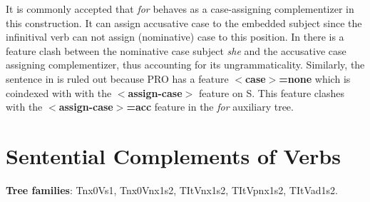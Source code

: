 It is commonly accepted that {\it for\/} behaves as a case-assigning
complementizer in this construction. It can assign accusative case to the
embedded subject since the infinitival verb can not assign
(nominative) case to this position.  
In  there is a feature clash between the nominative case subject {\it
she} and the accusative case assigning complementizer, thus accounting for its
ungrammaticality. Similarly, the sentence in  is ruled out because PRO
has a feature {\bf $<$case$>$=none} which is coindexed with with the {\bf
$<$assign-case$>$} feature on S. This feature clashes with the {\bf
$<$assign-case$>$=acc} feature in the {\it for} auxiliary tree.




\section{Sentential Complements of Verbs}
\label{sent-complements}
{\bf Tree families}: Tnx0Vs1, Tnx0Vnx1s2, TItVnx1s2, TItVpnx1s2, TItVad1s2.

